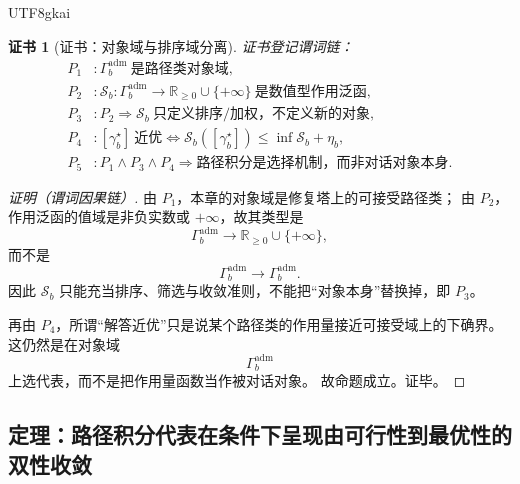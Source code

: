 \documentclass[12pt]{article}
\newtheorem{Certificate}{证书}[section]
\begin{document}
\begin{CJK*}{UTF8}{gkai}
\begin{Certificate}[证书：对象域与排序域分离]
\label{cert:tex37-ch4-path-integral-selector}
证书登记谓词链：
\[
\begin{aligned}
  P_1 &: \Gamma_b^{\mathrm{adm}}\ \text{是路径类对象域},\\
  P_2 &: \mathcal{S}_b:\Gamma_b^{\mathrm{adm}}\to \mathbb{R}_{\ge 0}\cup\{+\infty\}\ \text{是数值型作用泛函},\\
  P_3 &: P_2\Rightarrow \mathcal{S}_b\ \text{只定义排序/加权，不定义新的对象},\\
  P_4 &: [\gamma_b^\star]\ \text{近优} \Longleftrightarrow \mathcal{S}_b([\gamma_b^\star])\le \inf \mathcal{S}_b + \eta_b,
    \\
  P_5 &: P_1\wedge P_3\wedge P_4\Rightarrow \text{路径积分是选择机制，而非对话对象本身}.
\end{aligned}
\]
\end{Certificate}

\begin{proof}[证明（谓词因果链）]
由 $P_1$，本章的对象域是修复塔上的可接受路径类；
由 $P_2$，作用泛函的值域是非负实数或 $+\infty$，故其类型是
\[
  \Gamma_b^{\mathrm{adm}}
  \longrightarrow
  \mathbb{R}_{\ge 0}\cup\{+\infty\},
\]
而不是
\[
  \Gamma_b^{\mathrm{adm}}
  \longrightarrow
  \Gamma_b^{\mathrm{adm}}.
\]
因此 $\mathcal{S}_b$ 只能充当排序、筛选与收敛准则，不能把“对象本身”替换掉，即 $P_3$。

再由 $P_4$，所谓“解答近优”只是说某个路径类的作用量接近可接受域上的下确界。
这仍然是在对象域
\[
  \Gamma_b^{\mathrm{adm}}
\]
上选代表，而不是把作用量函数当作被对话对象。
故命题成立。证毕。
\end{proof}

\subsection{定理：路径积分代表在条件下呈现由可行性到最优性的双性收敛}
\label{subsec:tex37-ch4-convergence}


\end{CJK*}
\end{document}
